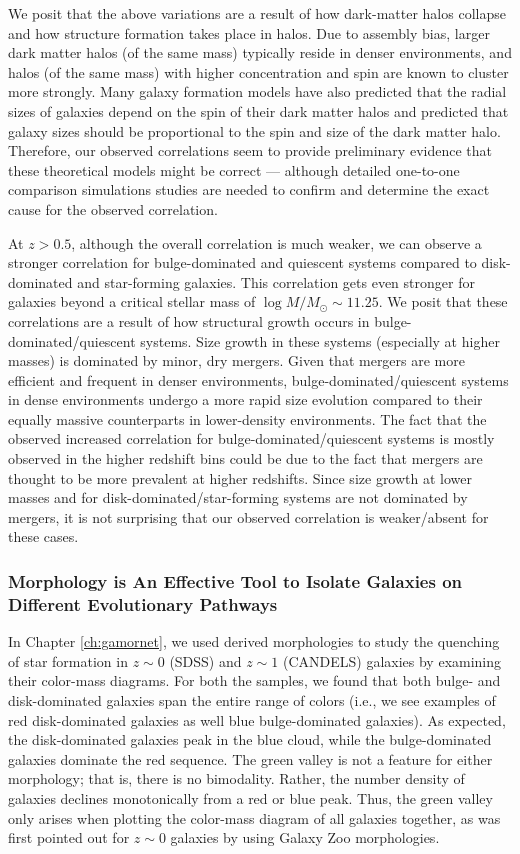 We posit that the above variations are a result of how dark-matter halos collapse and how structure formation takes place in halos. Due to assembly bias, larger dark matter halos (of the same mass) typically reside in denser environments, and  halos (of the same mass) with higher concentration and spin are known to cluster more strongly. Many galaxy formation models have also predicted that the radial sizes of galaxies depend on the spin of their dark matter halos and predicted that galaxy sizes should be proportional to the spin and size of the dark matter halo. Therefore, our observed correlations seem to provide preliminary evidence that these theoretical models might be correct --- although detailed one-to-one comparison simulations studies are needed to confirm and determine the exact cause for the observed correlation.

At $z > 0.5$, although the overall correlation is much weaker, we can observe a stronger correlation for bulge-dominated and quiescent systems compared to disk-dominated and star-forming galaxies. This correlation gets even stronger for galaxies beyond a critical stellar mass of $\log M/M_{\odot} \sim 11.25$. We posit that these correlations are a result of how structural growth occurs in bulge-dominated/quiescent systems. Size growth in these systems (especially at higher masses) is dominated by minor, dry mergers. Given that mergers are more efficient and frequent in denser environments, bulge-dominated/quiescent systems in dense environments undergo a more rapid size evolution compared to their equally massive counterparts in lower-density environments. The fact that the observed increased correlation for bulge-dominated/quiescent systems is mostly observed in the higher redshift bins could be due to the fact that mergers are thought to be more prevalent at higher redshifts. Since size growth at lower masses and for disk-dominated/star-forming systems are not dominated by mergers, it is not surprising that our observed correlation is weaker/absent for these cases. 

\subsubsection{Morphology is An Effective Tool to Isolate Galaxies on Different Evolutionary Pathways} \label{sec_conc:color_mass}

In Chapter \ref{ch:gamornet}, we used \gamornet{} derived morphologies to study the quenching of star formation in  $z\sim0$ (SDSS) and $z\sim1$ (CANDELS) galaxies by examining their color-mass diagrams. For both the samples, we found that both bulge- and disk-dominated galaxies span the entire range of colors (i.e., we see examples of red disk-dominated galaxies as well blue bulge-dominated galaxies). As expected, the disk-dominated galaxies peak in the blue cloud, while the bulge-dominated galaxies dominate the red sequence. The green valley is not a feature for either morphology; that is, there is no bimodality. Rather, the number density of galaxies declines monotonically from a red or blue peak. Thus, the green valley only arises when plotting the color-mass diagram of all galaxies together, as was first pointed out for $z\sim0$ galaxies by using Galaxy Zoo morphologies. 

